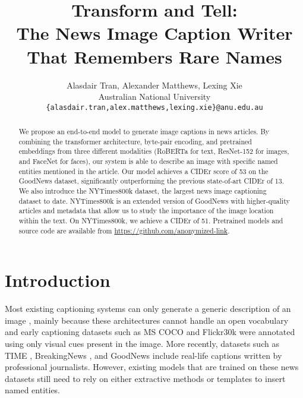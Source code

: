 \documentclass[10pt,twocolumn,letterpaper]{article}
\begin{document}
\title{Transform and Tell:\\The News Image Caption Writer That Remembers Rare Names}

\author{Alasdair Tran, Alexander Matthews, Lexing Xie\\
Australian National University\\
{\tt\small \{alasdair.tran,alex.matthews,lexing.xie\}@anu.edu.au}
}

\maketitle

\begin{abstract}
   We propose an end-to-end model to generate image captions in news articles.
   By combining the transformer architecture, byte-pair encoding, and
   pretrained embeddings from three different modalities (RoBERTa for text,
   ResNet-152 for images, and FaceNet for faces), our system is able to
   describe an image with specific named entities mentioned in the article. Our
   model achieves a CIDEr score of 53 on the GoodNews dataset, significantly
   outperforming the previous state-of-art CIDEr of 13. We also introduce the
   NYTimes800k dataset, the largest news image captioning dataset to date.
   NYTimes800k is an extended version of GoodNews with higher-quality articles and
   metadata that allow us to study the importance of the image location within
   the text. On NYTimes800k, we achieve a CIDEr of 51. Pretrained models and
   source code are available from
   \href{https://github.com}{https://github.com/anonymized-link}.
\end{abstract}

\section{Introduction}

Most existing captioning systems can only generate a generic description of an
image \cite{Donahue2015LongTR, Vinyals2015ShowAT, Fang2015FromCT,
Karpathy2015DeepVA, Rennie2017SelfCriticalST, Lu2017KnowingWT,
Anderson2017BottomUpAT, Cornia2019ShowCT}, mainly because these architectures
cannot handle an open vocabulary and early captioning datasets such as MS COCO
\cite{Lin2014MicrosoftCC, Chen2015MicrosoftCC} and Flickr30k
\cite{Young2014FromID} were annotated using only visual cues present in the
image. More recently, datasets such as TIME \cite{Tariq2017ACE}, BreakingNews
\cite{Ramisa2016BreakingNewsAA}, and GoodNews \cite{Biten2019GoodNews} include
real-life captions written by professional journalists. However, existing
models that are trained on these news datasets still need to rely on either
extractive methods or templates to insert named entities.
\end{document}
